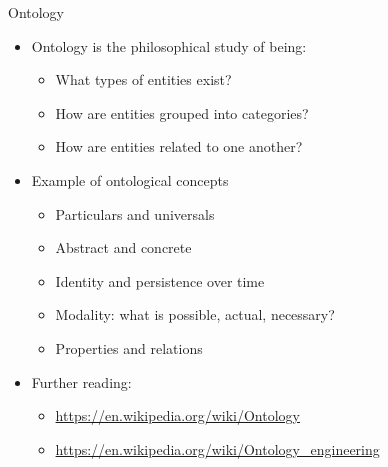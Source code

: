 \begin{Slide}{Ontology}
\begin{itemize}
\item Ontology is the philosophical study of being:
\begin{itemize}
\item What types of entities exist?
\item How are entities grouped into categories? 
\item How are entities related to one another?
\end{itemize}
\item Example of ontological concepts
\begin{itemize}
\item Particulars and universals
\item Abstract and concrete
\item Identity and persistence over time
\item Modality: what is possible, actual, necessary?
\item Properties and relations
\end{itemize}
\item Further reading: 
\begin{itemize}
\item \url{https://en.wikipedia.org/wiki/Ontology}
\item \url{https://en.wikipedia.org/wiki/Ontology_engineering}

\end{itemize}
\end{itemize}
\end{Slide}